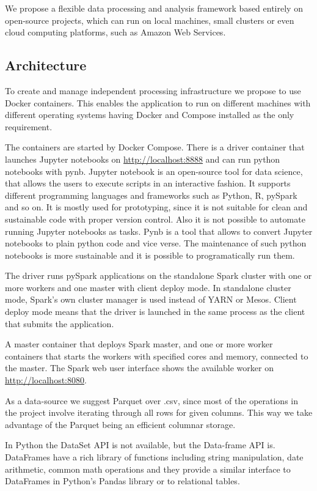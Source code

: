 We propose a flexible data processing and analysis framework based entirely on open-source projects, which can run on local machines, small clusters or even cloud computing platforms, such as Amazon Web Services. 

\subsection{Architecture}
To create and manage independent processing infrastructure we propose to use Docker containers. This enables the application to run on different machines with different operating systems having Docker and Compose installed as the only requirement. 

The containers are started by Docker Compose. There is a driver container that launches Jupyter notebooks on \url{http://localhost:8888} and can run python notebooks with pynb. 
Jupyter notebook is an open-source tool for data science, that allows the users to execute scripts in an interactive fashion. It supports different programming languages and frameworks such as Python, R, pySpark and so on. It is mostly used for prototyping, since it is not suitable for clean and sustainable code with proper version control. Also it is not possible to automate running Jupyter notebooks as tasks. 
Pynb is a tool that allows to convert Jupyter notebooks to plain python code and vice verse. The maintenance of such python notebooks is more sustainable and it is possible to programatically run them. \cite{pynb}

The driver runs pySpark applications on the standalone Spark cluster with one or more workers and one master with client deploy mode. In standalone cluster mode, Spark's own cluster manager is used instead of YARN or Mesos. Client deploy mode means that  the driver is launched in the same process as the client that submits the application. 

A master container that deploys Spark master, and one or more worker containers that starts the workers with specified cores and memory, connected to the master. The Spark web user interface shows the available worker on \url{http://localhost:8080}.

As a data-source we suggest Parquet over .csv, since most of the operations in the project involve iterating through all rows for given columns. This way we take advantage of the Parquet being an efficient columnar storage.

In Python the DataSet API is not available, but the Data-frame API is. DataFrames have a rich library of functions including string manipulation, date arithmetic, common math operations and they provide a similar interface to DataFrames in Python's Pandas library or to relational tables. \cite{spark-sql}

